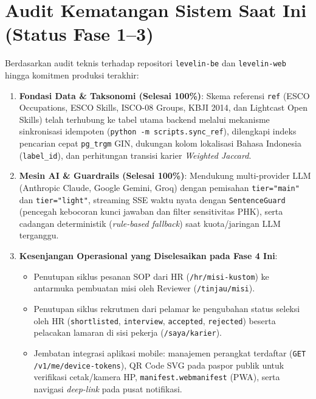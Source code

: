\documentclass[11pt,a4paper]{report}
\begin{document}
\section{Audit Kematangan Sistem Saat Ini (Status Fase 1--3)}
Berdasarkan audit teknis terhadap repositori \texttt{levelin-be} dan \texttt{levelin-web} hingga komitmen produksi terakhir:
\begin{enumerate}[leftmargin=1.5em]
    \item \textbf{Fondasi Data \& Taksonomi (Selesai 100\%)}: Skema referensi \texttt{ref} (ESCO Occupations, ESCO Skills, ISCO-08 Groups, KBJI 2014, dan Lightcast Open Skills) telah terhubung ke tabel utama backend melalui mekanisme sinkronisasi idempoten (\texttt{python -m scripts.sync\_ref}), dilengkapi indeks pencarian cepat \texttt{pg\_trgm} GIN, dukungan kolom lokalisasi Bahasa Indonesia (\texttt{label\_id}), dan perhitungan transisi karier \textit{Weighted Jaccard}.
    \item \textbf{Mesin AI \& Guardrails (Selesai 100\%)}: Mendukung multi-provider LLM (Anthropic Claude, Google Gemini, Groq) dengan pemisahan \texttt{tier="main"} dan \texttt{tier="light"}, streaming SSE waktu nyata dengan \texttt{SentenceGuard} (pencegah kebocoran kunci jawaban dan filter sensitivitas PHK), serta cadangan deterministik (\textit{rule-based fallback}) saat kuota/jaringan LLM terganggu.
    \item \textbf{Kesenjangan Operasional yang Diselesaikan pada Fase 4 Ini}:
    \begin{itemize}
        \item Penutupan siklus pesanan SOP dari HR (\texttt{/hr/misi-kustom}) ke antarmuka pembuatan misi oleh Reviewer (\texttt{/tinjau/misi}).
        \item Penutupan siklus rekrutmen dari pelamar ke pengubahan status seleksi oleh HR (\texttt{shortlisted}, \texttt{interview}, \texttt{accepted}, \texttt{rejected}) beserta pelacakan lamaran di sisi pekerja (\texttt{/saya/karier}).
        \item Jembatan integrasi aplikasi mobile: manajemen perangkat terdaftar (\texttt{GET /v1/me/device-tokens}), QR Code SVG pada paspor publik untuk verifikasi cetak/kamera HP, \texttt{manifest.webmanifest} (PWA), serta navigasi \textit{deep-link} pada pusat notifikasi.
    \end{itemize}
\end{enumerate}

\end{document}

